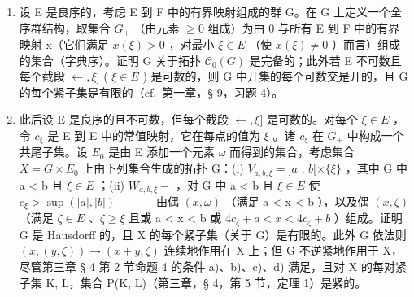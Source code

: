 \begin{enumerate}
\def\labelenumi{\alph{enumi})}
\setcounter{enumi}{1}
\item
  设 E 是良序的，考虑 E 到 F 中的有界映射组成的群 G。在 G 上定义一个全序群结构，取集合 \(G_{+}\) （由元素 \(\geqslant0\) 组成）为由 0 与所有 E 到 F 中的有界映射 x（它们满足 \(x(\xi)>0\) ，对最小 \(\xi\in E\) （使 \(x(\xi)\neq0\) ）而言）组成的集合（字典序）。证明 G 关于拓扑 \(\mathcal{C}_{0}(G)\) 是完备的；此外若 E 不可数且每个截段 \(\leftarrow,\xi]\) ( \(\xi\in E\) ) 是可数的，则 G 中开集的每个可数交是开的，且 G 的每个紧子集是有限的（cf.~第一章，§ 9，习题 4）。
\item
  此后设 E 是良序的且不可数，但每个截段 \(\leftarrow,\xi]\) 是可数的。对每个 \(\xi\in E\) ，令 \(c_{\xi}\) 是 E 到 E 中的常值映射，它在每点的值为 \(\xi\) 。诸 \(c_{\xi}\) 在 \(G_{+}\) 中构成一个共尾子集。设 \(E_{0}\) 是由 E 添加一个元素 \(\omega\) 而得到的集合，考虑集合 \(X=G\times E_{0}\) 上由下列集合生成的拓扑 G：(i) \(V_{a,b,\xi} = ]a\) , \(b[\times\{\xi\}\) ，其中 G 中 a \textless{} b 且 \(\xi\in E\) ；(ii) \(W_{a,b,\xi} -\) ，对 G 中 a \textless{} b 且 \(\xi\in E\) 使 \(c_{\xi} > \sup(|a|, |b|) -\) ——由偶 \((x, \omega)\) （满足 a \textless{} x \textless{} b ），以及偶 \((x, \zeta)\) （满足 \(\zeta\in E\) 、\(\zeta \geqslant \xi\) 且或 a \textless{} x \textless{} b 或 \(4c_{\zeta} + a < x < 4c_{\zeta} + b\) ）组成。证明 G 是 Hausdorff 的，且 X 的每个紧子集（关于 G）是有限的。此外 G 依法则 \((x, (y, \zeta)) \to (x + y, \zeta)\) 连续地作用在 X 上；但 G 不逆紧地作用于 X，尽管第三章 § 4 第 2 节命题 4 的条件 a)、b)、c)、d) 满足，且对 X 的每对紧子集 K, L，集合 P(K, L)（第三章，§ 4，第 5 节，定理 1）是紧的。
\end{enumerate}
\relax{}
